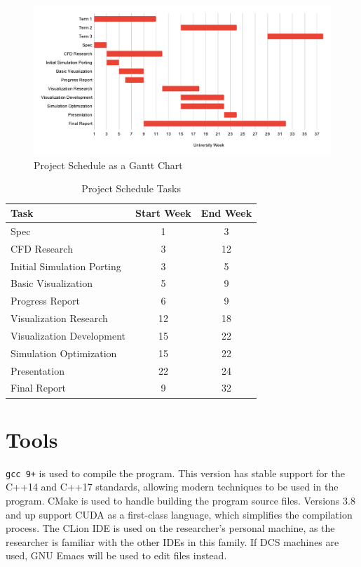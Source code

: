 \begin{figure}[ht]
    \centering
    \includegraphics[width=\linewidth]{cs311_gantt_chart.svg.pdf}
    \caption{Project Schedule as a Gantt Chart}
    \label{fig:project schedule gantt}
\end{figure}

\begin{table}[ht]
    \centering
    \begin{tabular}{l|c|c}
    \textbf{Task} & \textbf{Start Week} & \textbf{End Week} \\
    \hline
    Spec & 1 & 3 \\
    CFD Research & 3 & 12 \\
    Initial Simulation Porting & 3 & 5 \\
    Basic Visualization & 5 & 9 \\
    Progress Report & 6 & 9 \\
    Visualization Research & 12 & 18 \\
    Visualization Development & 15 & 22 \\
    Simulation Optimization & 15 & 22 \\
    Presentation & 22 & 24 \\
    Final Report & 9 & 32 \\
    \end{tabular}
    \caption{Project Schedule Tasks}
    \label{tab:project schedule table}
\end{table}

\section{Tools}
\label{sec:ProjManagementTools}
\verb|gcc 9+|\cite{tool:Gcc9} is used to compile the program.
This version has stable support for the C++14 and C++17 standards\cite{tool:GccCxxStatus}, allowing modern techniques to be used in the program.
CMake\cite{tool:Cmake} is used to handle building the program source files.
Versions 3.8 and up support CUDA as a first-class language\cite{tool:CmakeCUDAFirstClass}, which simplifies the compilation process.
The CLion IDE\cite{tool:CLion} is used on the researcher's personal machine, as the researcher is familiar with the other IDEs in this family.
If DCS machines are used, GNU Emacs\cite{tool:Emacs} will be used to edit files instead.

